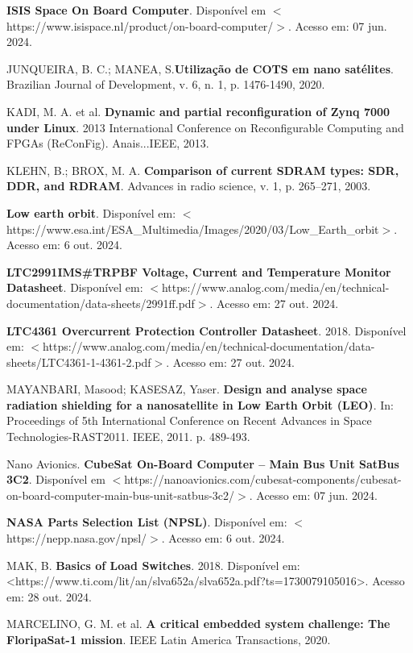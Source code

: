 \begin{flushleft}
\begin{thebibliography}{00}
 \textbf{ISIS Space On Board Computer}. Disponível em $<$https://www.isispace.nl/product/on-board-computer/$>$. Acesso em: 07 jun. 2024.

 JUNQUEIRA, B. C.; MANEA, S.\textbf{Utilização de COTS em nano satélites}. Brazilian Journal of Development, v. 6, n. 1, p. 1476-1490, 2020.

 KADI, M. A. et al. \textbf{Dynamic and partial reconfiguration of Zynq 7000 under Linux}. 2013 International Conference on Reconfigurable Computing and FPGAs (ReConFig). Anais...IEEE, 2013.

 KLEHN, B.; BROX, M. A. \textbf{Comparison of current SDRAM types: SDR, DDR, and RDRAM}. Advances in radio science, v. 1, p. 265–271, 2003.

 \textbf{Low earth orbit}. Disponível em: $<$https://www.esa.int/ESA\_Multimedia/Images/2020/03/Low\_Earth\_orbit$>$. Acesso em: 6 out. 2024.

 \textbf{LTC2991IMS\#TRPBF Voltage, Current and Temperature Monitor Datasheet}. Disponível em: $<$https://www.analog.com/media/en/technical-documentation/data-sheets/2991ff.pdf$>$. Acesso em: 27 out. 2024. 

 \textbf{LTC4361 Overcurrent Protection Controller Datasheet}. 2018. Disponível em: $<$https://www.analog.com/media/en/technical-documentation/data-sheets/LTC4361-1-4361-2.pdf$>$. Acesso em: 27 out. 2024. 

 MAYANBARI, Masood; KASESAZ, Yaser. \textbf{Design and analyse space radiation shielding for a nanosatellite in Low Earth Orbit (LEO)}. In: Proceedings of 5th International Conference on Recent Advances in Space Technologies-RAST2011. IEEE, 2011. p. 489-493.

 Nano Avionics. \textbf{CubeSat On-Board Computer – Main Bus Unit SatBus 3C2}. Disponível em $<$https://nanoavionics.com/cubesat-components/cubesat-on-board-computer-main-bus-unit-satbus-3c2/$>$. Acesso em: 07 jun. 2024.

 \textbf{NASA Parts Selection List (NPSL)}. Disponível em: $<$https://nepp.nasa.gov/npsl/$>$. Acesso em: 6 out. 2024.

 MAK, B. \textbf{Basics of Load Switches}. 2018. Disponível em: <https://www.ti.com/lit/an/slva652a/slva652a.pdf?ts=1730079105016>. Acesso em: 28 out. 2024.

 MARCELINO, G. M. et al. \textbf{A critical embedded system challenge: The FloripaSat-1 mission}. IEEE Latin America Transactions, 2020.


\end{thebibliography}
\end{flushleft}
